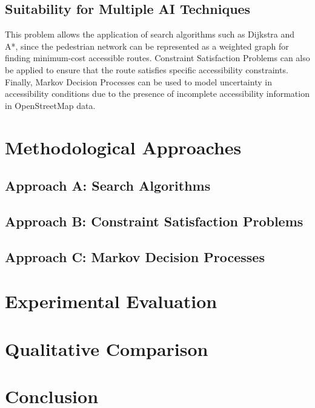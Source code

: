 \documentclass[letterpaper]{article} %
\begin{document}
\subsection{Suitability for Multiple AI Techniques}
This problem allows the application of search algorithms such as Dijkstra and A*, since the pedestrian network can be represented as a weighted graph for finding minimum-cost accessible routes. Constraint Satisfaction Problems can also be applied to ensure that the route satisfies specific accessibility constraints. Finally, Markov Decision Processes can be used to model uncertainty in accessibility conditions due to the presence of incomplete accessibility information in OpenStreetMap data.


\section{Methodological Approaches}

\subsection{Approach A: Search Algorithms}

\subsection{Approach B: Constraint Satisfaction Problems}

\subsection{Approach C: Markov Decision Processes}

\section{Experimental Evaluation}

\section{Qualitative Comparison}

\section{Conclusion}


\end{document}
